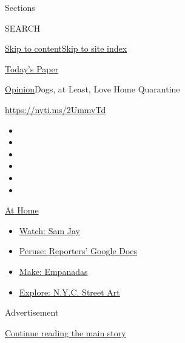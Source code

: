 Sections

SEARCH

\protect\hyperlink{site-content}{Skip to
content}\protect\hyperlink{site-index}{Skip to site index}

\href{https://myaccount.nytimes.com/auth/login?response_type=cookie\&client_id=vi}{}

\href{https://www.nytimes.com/section/todayspaper}{Today's Paper}

\href{/section/opinion}{Opinion}\textbar{}Dogs, at Least, Love Home
Quarantine

\href{https://nyti.ms/2UmmvTd}{https://nyti.ms/2UmmvTd}

\begin{itemize}
\item
\item
\item
\item
\item
\item
\end{itemize}

\href{https://www.nytimes.com/spotlight/at-home?action=click\&pgtype=Article\&state=default\&region=TOP_BANNER\&context=at_home_menu}{At
Home}

\begin{itemize}
\tightlist
\item
  \href{https://www.nytimes.com/2020/08/04/arts/television/sam-jay-netflix-special.html?action=click\&pgtype=Article\&state=default\&region=TOP_BANNER\&context=at_home_menu}{Watch:
  Sam Jay}
\item
  \href{https://www.nytimes.com/interactive/2020/at-home/even-more-reporters-editors-diaries-lists-recommendations.html?action=click\&pgtype=Article\&state=default\&region=TOP_BANNER\&context=at_home_menu}{Peruse:
  Reporters' Google Docs}
\item
  \href{https://www.nytimes.com/2020/08/04/dining/colombian-empanadas-carlos-gaviria.html?action=click\&pgtype=Article\&state=default\&region=TOP_BANNER\&context=at_home_menu}{Make:
  Empanadas}
\item
  \href{https://www.nytimes.com/2020/08/06/arts/design/street-art-nyc-george-floyd.html?action=click\&pgtype=Article\&state=default\&region=TOP_BANNER\&context=at_home_menu}{Explore:
  N.Y.C. Street Art}
\end{itemize}

Advertisement

\protect\hyperlink{after-top}{Continue reading the main story}

